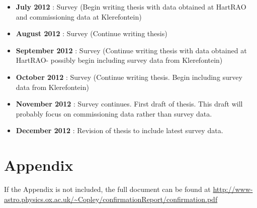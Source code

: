 \begin{itemize}
 \item \textbf{July 2012} : Survey (Begin writing thesis with data obtained at HartRAO and commissioning data at Klerefontein)
 \item \textbf{August 2012} : Survey (Continue writing thesis)
 \item \textbf{September 2012} : Survey (Continue writing thesis with data obtained at HartRAO- possibly begin including survey data from Klerefontein)
 \item \textbf{October 2012} : Survey (Continue writing thesis. Begin including survey data from Klerefontein)
 \item \textbf{November 2012} : Survey continues. First draft of thesis. This draft will probably focus on commissioning data rather than survey data.
 \item \textbf{December 2012} : Revision of thesis to include latest survey data.
\end{itemize}



\section{Appendix}

If the Appendix is not included, the full document can be found at \url{http://www-astro.physics.ox.ac.uk/~Copley/confirmationReport/confirmation.pdf}




\clearpage